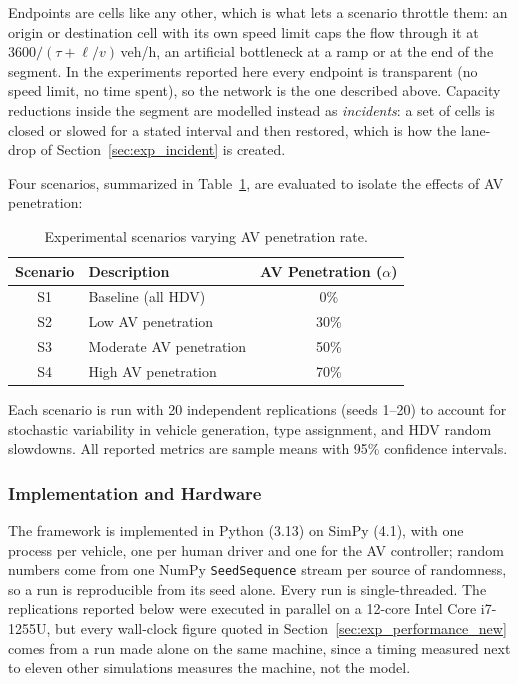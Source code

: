 \documentclass[review,authoryear]{elsarticle}
\begin{document}
Endpoints are cells like any other, which is what lets a scenario throttle them: an origin or destination cell with its own speed limit caps the flow through it at $3600 / (\tau + \ell/v)$\,veh/h, an artificial bottleneck at a ramp or at the end of the segment. In the experiments reported here every endpoint is transparent (no speed limit, no time spent), so the network is the one described above. Capacity reductions inside the segment are modelled instead as \emph{incidents}: a set of cells is closed or slowed for a stated interval and then restored, which is how the lane-drop of Section~\ref{sec:exp_incident} is created.

Four scenarios, summarized in Table~\ref{tab:scenarios}, are evaluated to isolate the effects of AV penetration:

\begin{table}[ht]
\centering
\caption{Experimental scenarios varying AV penetration rate.}
\label{tab:scenarios}
\begin{tabular}{@{}clc@{}}
\toprule
Scenario & Description & AV Penetration ($\alpha$) \\
\midrule
S1 & Baseline (all HDV) & 0\% \\
S2 & Low AV penetration & 30\% \\
S3 & Moderate AV penetration & 50\% \\
S4 & High AV penetration & 70\% \\
\bottomrule
\end{tabular}
\end{table}

Each scenario is run with 20 independent replications (seeds 1--20) to account for stochastic variability in vehicle generation, type assignment, and HDV random slowdowns. All reported metrics are sample means with 95\% confidence intervals.

\subsubsection{Implementation and Hardware}

The framework is implemented in Python (3.13) on SimPy (4.1), with one process per vehicle, one per human driver and one for the AV controller; random numbers come from one NumPy \texttt{SeedSequence} stream per source of randomness, so a run is reproducible from its seed alone. Every run is single-threaded. The replications reported below were executed in parallel on a 12-core Intel Core i7-1255U, but every wall-clock figure quoted in Section~\ref{sec:exp_performance_new} comes from a run made alone on the same machine, since a timing measured next to eleven other simulations measures the machine, not the model.
\end{document}

